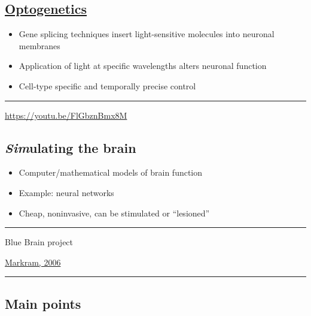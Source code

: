 \documentclass[]{article}
\providecommand{\tightlist}{%
  \setlength{\itemsep}{0pt}\setlength{\parskip}{0pt}}
\begin{document}
\subsection{\texorpdfstring{\href{https://en.wikipedia.org/wiki/Optogenetics}{Optogenetics}}{Optogenetics}}\label{optogenetics}

\begin{itemize}
\tightlist
\item
  Gene splicing techniques insert light-sensitive molecules into
  neuronal membranes
\item
  Application of light at specific wavelengths alters neuronal function
\item
  Cell-type specific and temporally precise control
\end{itemize}

\begin{center}\rule{0.5\linewidth}{\linethickness}\end{center}

\url{https://youtu.be/FlGbznBmx8M}

\subsection{\texorpdfstring{\emph{Sim}ulating the
brain}{Simulating the brain}}\label{simulating-the-brain}

\begin{itemize}
\tightlist
\item
  Computer/mathematical models of brain function
\item
  Example: neural networks
\item
  Cheap, noninvasive, can be stimulated or ``lesioned''
\end{itemize}

\begin{center}\rule{0.5\linewidth}{\linethickness}\end{center}

Blue Brain project

\href{http://doi.org/10.1038/nrn1848}{Markram, 2006}

\begin{center}\rule{0.5\linewidth}{\linethickness}\end{center}

\subsection{Main points}\label{main-points}
\end{document}
